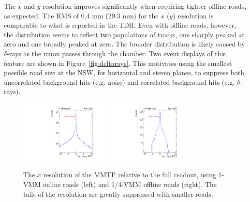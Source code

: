 The $x$ and $y$ resolution improves significantly when requiring tighter offline roads, as expected. The RMS of 0.4 mm (29.3 mm) for the $x$ ($y$) resolution is comparable to what is reported in the TDR. Even with offline roads, however, the distribution seems to reflect two populations of tracks, one sharply peaked at zero and one broadly peaked at zero. The broader distribution is likely caused by $\delta$-rays as the muon passes through the chamber. Two event displays of this feature are shown in Figure~\ref{fig:deltarays}. This motivates using the smallest possible road size at the NSW, for horizontal and stereo planes, to suppress both uncorrelated background hits (e.g. noise) and correlated background hits (e.g. $\delta$-rays).

\begin{figure}[!htpb]
  \begin{center}
    \includegraphics[width=0.4\textwidth]{figures/gbtanalysis3522/TP_xres_full.pdf}
    \includegraphics[width=0.4\textwidth]{figures/gbtanalysis3522/TP_xres.pdf}
  \end{center}
  \vspace{-10pt}
  \caption{The $x$ resolution of the MMTP relative to the full readout, using 1-VMM online roads (left) and 1/4-VMM offline roads (right). The tails of the resolution are greatly suppressed with smaller roads.}
  \label{fig:xres}
\end{figure}

